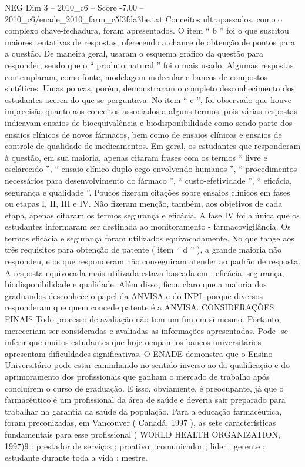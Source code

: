 \begin{textsample}{NEG Dim 3 – 2010\_c6 – Score -7.00 – 2010\_c6/enade\_2010\_farm\_c5f3fda3be.txt}
Conceitos ultrapassados, como o complexo chave-fechadura, foram apresentados.
O item “ b ” foi o que suscitou maiores tentativas de respostas, oferecendo a chance de obtenção de pontos para a questão.
De maneira geral, usaram o esquema gráfico da questão para responder, sendo que o “ produto natural ” foi o mais usado.
Algumas respostas contemplaram, como fonte, modelagem molecular e bancos de compostos sintéticos.
Umas poucas, porém, demonstraram o completo desconhecimento dos estudantes acerca do que se perguntava.
No item “ c ”, foi observado que houve imprecisão quanto aos conceitos associados a alguns termos, pois várias respostas indicavam ensaios de bioequivalência e biodisponibilidade como sendo parte dos ensaios clínicos de novos fármacos, bem como de ensaios clínicos e ensaios de controle de qualidade de medicamentos.
Em geral, os estudantes que responderam à questão, em sua maioria, apenas citaram frases com os termos “ livre e esclarecido ”, “ ensaio clínico duplo cego envolvendo humanos ”, “ procedimentos necessários para desenvolvimento do fármaco ”, “ custo-efetividade ”, “ eficácia, segurança e qualidade ”.
Poucos fizeram citações sobre ensaios clínicos em fases ou etapas I, II, III e IV.
Não fizeram menção, também, aos objetivos de cada etapa, apenas citaram os termos segurança e eficácia.
A fase IV foi a única que os estudantes informaram ser destinada ao monitoramento - farmacovigilância.
Os termos eficácia e segurança foram utilizados equivocadamente.
No que tange aos três requisitos para obtenção de patente ( item “ d ” ), a grande maioria não respondeu, e os que responderam não conseguiram atender ao padrão de resposta.
A resposta equivocada mais utilizada estava baseada em : eficácia, segurança, biodisponibilidade e qualidade.
Além disso, ficou claro que a maioria dos graduandos desconhece o papel da ANVISA e do INPI, porque diversos responderam que quem concede patente é a ANVISA.
CONSIDERAÇÕES FINAIS Todo processo de avaliação não tem um fim em si mesmo.
Portanto, mereceriam ser consideradas e avaliadas as informações apresentadas.
Pode -se inferir que muitos estudantes que hoje ocupam os bancos universitários apresentam dificuldades significativas.
O ENADE demonstra que o Ensino Universitário pode estar caminhando no sentido inverso ao da qualificação e do aprimoramento dos profissionais que ganham o mercado de trabalho após concluírem o curso de graduação.
E isso, obviamente, é preocupante, já que o farmacêutico é um profissional da área de saúde e deveria sair preparado para trabalhar na garantia da saúde da população.
Para a educação farmacêutica, foram preconizadas, em Vancouver ( Canadá, 1997 ), as sete características fundamentais para esse profissional ( WORLD HEALTH ORGANIZATION, 1997)9 : prestador de serviços ; proativo ; comunicador ; líder ; gerente ; estudante durante toda a vida ; mestre.

\end{textsample}
